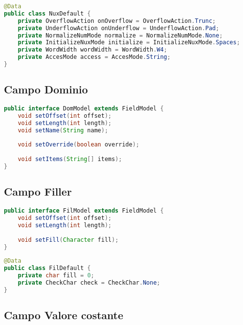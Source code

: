 \documentclass[a4paper,10pt]{report}
\begin{document}
\begin{lstlisting}[language=java, caption=class NuxDefault, 
label=code:NuxDefault]
@Data
public class NuxDefault {
    private OverflowAction onOverflow = OverflowAction.Trunc;
    private UnderflowAction onUnderflow = UnderflowAction.Pad;
    private NormalizeNumMode normalize = NormalizeNumMode.None;
    private InitializeNuxMode initialize = InitializeNuxMode.Spaces;
    private WordWidth wordWidth = WordWidth.W4;
    private AccesMode access = AccesMode.String;
}
\end{lstlisting}

\subsection{Campo Dominio}

\begin{lstlisting}[language=java, caption=interfaccia DomModel, 
label=code:DomModel]
public interface DomModel extends FieldModel {
    void setOffset(int offset);
    void setLength(int length);
    void setName(String name);
    
    void setOverride(boolean override);
    
    void setItems(String[] items);
}
\end{lstlisting}


\subsection{Campo Filler}

\begin{lstlisting}[language=java, caption=interfaccia FilModel, 
label=code:FilModel]
public interface FilModel extends FieldModel {
    void setOffset(int offset);
    void setLength(int length);
    
    void setFill(Character fill);
}
\end{lstlisting}

\begin{lstlisting}[language=java, caption=class FilDefault, 
label=code:FilDefault]
@Data
public class FilDefault {
    private char fill = 0;
    private CheckChar check = CheckChar.None;
}
\end{lstlisting}

\subsection{Campo Valore costante}
\end{document}
